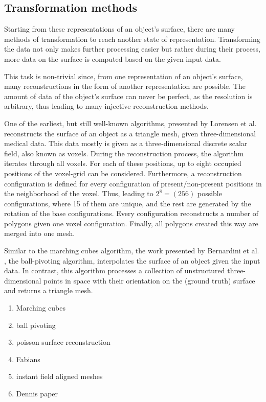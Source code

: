 \subsection{Transformation methods}
Starting from these representations of an object's surface, there are many methods 
of transformation to reach another state of representation. 
Transforming the data not only makes further processing easier
 but rather during their process, more data on the surface is 
 computed based on the given input data.

 This task is non-trivial since, from one representation of an object's surface, many reconstructions in the form of another representation are possible. The amount of data of the object's surface can never be perfect, as the resolution is arbitrary, thus leading to many injective reconstruction methods.

One of the earliest, but still well-known algorithms, presented by
 Lorensen et al. \cite{Lorensen:1987:MCH:37402.37422} reconstructs the surface of an object as a
  triangle mesh, given three-dimensional medical data. This data mostly is given as
   a three-dimensional discrete scalar field, also known as voxels. 
During the reconstruction process, the algorithm iterates through all voxels. For each of these positions, up to eight occupied positions of the voxel-grid can be considered. Furthermore, a reconstruction configuration is defined for every configuration of present/non-present positions in the neighborhood of the voxel. Thus, leading to $2^8 = (256)$ possible configurations, where 15 of them are unique, and the rest are generated by the rotation of the base configurations.  Every configuration reconstructs a number of polygons given one voxel configuration. Finally, all polygons created this way are merged into one mesh.

Similar to the marching cubes algorithm, the work presented by 
Bernardini et al. \cite{817351}, the ball-pivoting algorithm, interpolates
 the surface of an object given the input data. In contrast, this 
 algorithm processes a collection of unstructured three-dimensional
  points in space with their orientation on the (ground truth) surface and returns 
  a triangle mesh.
\begin{enumerate}
  \item Marching cubes
  \item ball pivoting
  \item poisson surface reconstruction
  \item Fabians \cite{Groh2017}
  \item instant field aligned meshes
  \item Dennis paper\cite{bukenberger2018hierarchical}
\end{enumerate}


